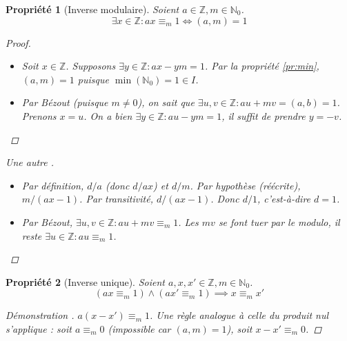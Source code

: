 \documentclass[11pt,twocolumn]{article}
\theoremstyle{plain}
\newtheorem{pr}{Propriété}
\newcommand{\esN}{\mathbb{N}} %
\newcommand{\esZ}{\mathbb{Z}} %
\newcommand{\dbi}{\Longleftrightarrow}
\newenvironment{cproof}[1]{\begin{proof}[Démonstration \cite{#1}]}{\end{proof}}
\begin{document}
\newpage
\begin{pr}[Inverse modulaire]
	Soient $a \in \esZ, m \in \esN_0$. \[
		\exists x \in \esZ : ax \equiv_m 1 \dbi (a,m)=1
	\]
	\begin{proof} ~
		\begin{itemize}
			\item[$\Rightarrow$]
				Soit $x \in \esZ$.
				Supposons $\exists y \in \esZ : ax-ym=1$.
				Par la propriété \ref{pr:min},
				$(a,m)=1$ puisque $\min(\esN_0)=1\in I$.
			\item[$\Leftarrow$]
				Par Bézout (puisque $m \neq 0$), on sait que
				$\exists u, v \in \esZ : au+mv = (a, b) = 1$.
				Prenons $x=u$. On a bien $\exists y \in \esZ : au-ym=1$,
				il suffit de prendre $y=-v$.
		\end{itemize}
	\end{proof}
	\begin{proof}[Une autre \cite{Buys}] ~
		\begin{itemize}
			\item[$\Rightarrow$]
				Par définition, $d/a$ (donc $d/ax$) et $d/m$.
				Par hypothèse (réécrite), $m/(ax-1)$.
				Par transitivité, $d/(ax-1)$.
				Donc $d/1$, c'est-à-dire $d=1$.
			\item[$\Leftarrow$]
				Par Bézout, $\exists u, v \in \esZ : au+mv \equiv_m 1$.
				Les $mv$ se font tuer par le modulo, il reste
				$\exists u \in \esZ : au \equiv_m 1$.
		\end{itemize}
	\end{proof}
\end{pr}
\begin{pr}[Inverse unique]
	Soient $a, x, x' \in \esZ, m \in \esN_0$. \[
		(ax \equiv_m 1) \land (ax' \equiv_m 1) \implies x \equiv_m x'
	\]
	\begin{cproof}{Buys}
		$a(x-x') \equiv_m 1$.
		Une règle analogue à celle du produit nul s'applique :
		soit $a \equiv_m 0$ (impossible car $(a,m)=1$),
		soit $x-x' \equiv_m 0$.
	\end{cproof}
\end{pr}
\end{document}
